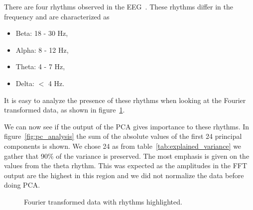 There are four rhythms observed in the EEG~\cite[chapter~11]{Ganong1997}. These rhythms differ in the frequency and are characterized as

\begin{itemize}
	\item Beta: 18 - 30 Hz,
	\item Alpha: 8 - 12 Hz,
	\item Theta: 4 - 7 Hz,
	\item Delta: $<$ 4 Hz.
\end{itemize}

It is easy to analyze the presence of these rhythms when looking at the Fourier transformed data, as shown in figure~\ref{fig:eeg_with_rhythm}.

We can now see if the output of the PCA gives importance to these rhythms. In figure~\ref{fig:pc_analysis} the sum of the absolute values of the first 24 principal components is shown. We chose 24 as from table~\ref{tab:explained_variance} we gather that 90\% of the variance is preserved. The most emphasis is given on the values from the theta rhythm. This was expected as the amplitudes in the FFT output are the highest in this region and we did not normalize the data before doing PCA.


\newpage
\begin{figure}
	\centering	
	
	\caption{Fourier transformed data with rhythms highlighted.}
	\label{fig:eeg_with_rhythm}
\end{figure}


